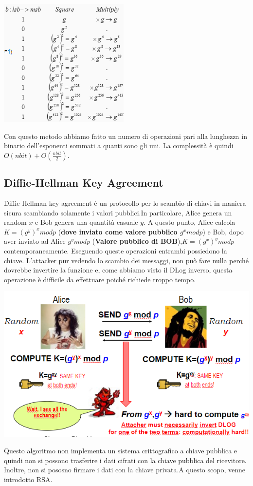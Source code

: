\documentclass{book}
\theoremstyle{remark}
\begin{document}
\begin{center}
	\includegraphics[scale=1]{2021-12-04-15-26-00.png}
\end{center}
Con questo metodo abbiamo fatto un numero di operazioni pari alla lunghezza in binario dell'esponenti sommati a quanti sono gli uni\@. La complessità è quindi \(O(nbit)+O(\frac{nbit}{2})\)\@.
\subsection{Diffie-Hellman Key Agreement}
Diffie Hellman key agreement è un protocollo per lo scambio di chiavi in maniera sicura scambiando solamente i valori pubblici\@.\newline In particolare, Alice genera un random \(x\) e Bob genera una quantità casuale \(y\)\@. A questo punto, Alice calcola \(K=(g^y)^x mod p\) (\textbf{dove inviato come valore pubblico \(g^x modp\)}) e Bob, dopo aver inviato ad Alice \(g^y modp\) (\textbf{Valore pubblico di BOB}),\(K= (g^x)^y mod p\) contemporaneamente\@. Eseguendo queste operazioni entrambi possiedono la chiave\@. L'attacker pur vedendo lo scambio dei messaggi, non può fare nulla perché dovrebbe invertire la funzione e, come abbiamo visto il DLog inverso, questa operazione è difficile da effettuare poiché richiede troppo tempo\@.
\begin{center}
	\includegraphics[scale=0.6]{2021-12-04-15-43-15.png}
\end{center}
Questo algoritmo non implementa un sistema crittografico a chiave pubblica e quindi non si possono trasferire i dati cifrati con la chiave pubblica del ricevitore\@. Inoltre, non si pososno firmare i dati con la chiave privata\@.\newline A questo scopo, venne introdotto RSA\@.
\end{document}
